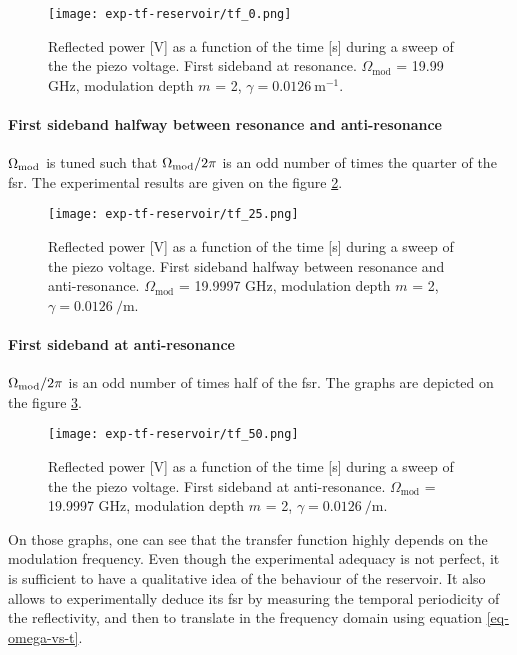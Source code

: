 \begin{figure}
	\centering
	\texttt{[image: exp-tf-reservoir/tf\_0.png]}
	\caption{Reflected power [V] as a function of the time [s] during a sweep of the the piezo voltage. First sideband at resonance. $\Omega_{\text{mod}}$ = 19.99 GHz, modulation depth $m$ = 2, $\gamma = 0.0126~\text{m}^{-1}$.}
	\label{tf_0}
\end{figure}

\paragraph{First sideband halfway between resonance and anti-resonance} $\Omega_{\text{mod}}$ is tuned such that $\Omega_{\text{mod}}/2\pi$ is an odd number of times the quarter of the \gls{fsr}. The experimental results are given on the figure \ref{tf_25}.

\begin{figure}
	\centering
	\texttt{[image: exp-tf-reservoir/tf\_25.png]}
	\caption{Reflected power [V] as a function of the time [s] during a sweep of the piezo voltage. First sideband halfway between resonance and anti-resonance. $\Omega_{\text{mod}}$ = 19.9997 GHz, modulation depth $m$ = 2, $\gamma = \SI{0.0126}{\per\metre}$.}
	\label{tf_25}
\end{figure}

\paragraph{First sideband at anti-resonance} $\Omega_{\text{mod}}/2\pi$ is an odd number of times half of the \gls{fsr}. The graphs are depicted on the figure \ref{tf_50}.\\

\begin{figure}
	\centering
	\texttt{[image: exp-tf-reservoir/tf\_50.png]}
	\caption{Reflected power [V] as a function of the time [s] during a sweep of the the piezo voltage. First sideband at anti-resonance. $\Omega_{\text{mod}}$ = 19.9997 GHz, modulation depth $m$ = 2, $\gamma = \SI{0.0126}{\per\metre}$.}
	\label{tf_50}
\end{figure}

On those graphs, one can see that the transfer function highly depends on the modulation frequency. Even though the experimental adequacy is not perfect, it is sufficient to have a qualitative idea of the behaviour of the reservoir. It also allows to experimentally deduce its \gls{fsr} by measuring the temporal periodicity of the reflectivity, and then to translate in the frequency domain using equation \eqref{eq-omega-vs-t}.


